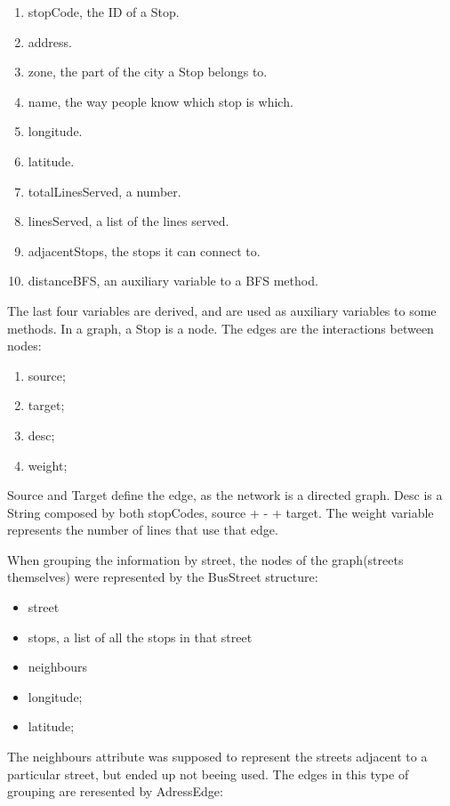 \documentclass[12pt]{article}
\begin{document}
\begin{enumerate}
	\item stopCode, the ID of a Stop.
	\item address.
	\item zone, the part of the city a Stop belongs to.
	\item name, the way people know which stop is which.
	\item longitude.
	\item latitude.
	\item totalLinesServed, a number.
	\item linesServed, a list of the lines served.
	\item adjacentStops, the stops it can connect to.
	\item distanceBFS, an auxiliary variable to a BFS method.
\end{enumerate}
\newpage
	The last four variables are derived, and are used as auxiliary variables to some methods. In a graph, a Stop is a node. The edges are the interactions between nodes:
	
\begin{enumerate}
	\item source;
	\item target;
	\item desc;
	\item weight;
\end{enumerate}

Source and Target define the edge, as the network is a directed graph. Desc is a String composed by both stopCodes, source + - + target.
The weight variable represents the number of lines that use that edge. 


When grouping the information by street, the nodes of the graph(streets themselves) were represented by the BusStreet structure:

\begin{itemize}
	\item street
	\item stops, a list of all the stops in that street
	\item  neighbours
	\item longitude;
	\item latitude;
\end{itemize}

	The neighbours attribute was supposed to represent the streets adjacent to a particular street, but ended up not beeing used. The edges in this type of grouping are reresented by AdressEdge:
	
\end{document}

